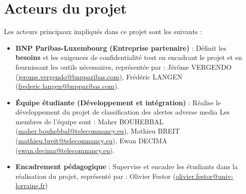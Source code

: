 \section{Acteurs du projet}

Les acteurs principaux impliqués dans ce projet sont les suivants :

\begin{itemize}
    \item \textbf{BNP Paribas-Luxembourg (Entreprise partenaire)} : Définit les \textbf{besoins} et les exigences de confidentialité tout en encadrant le projet et en fournissant les outils nécessaires, représentée par : Jérôme VERGENDO (\href{mailto:jerome.vergendo@bnpparibas.com}{jerome.vergendo@bnpparibas.com}), Frédéric LANGEN (\href{mailto:frederic.langen@bnpparibas.com}{frederic.langen@bnpparibas.com}).
    \item \textbf{Équipe étudiante (Développement et intégration)} : Réalise le développement du projet de classification des alertes adverse media
    Les membres de l'équipe sont : Maher BOUHEBBAL (\href{mailto:maher.bouhebbal@telecomnancy.eu}{maher.bouhebbal@telecomnancy.eu}), Mathieu BREIT (\href{mailto:mathieu.breit@telecomnancy.eu}{mathieu.breit@telecomnancy.eu}), Ewan DECIMA (\href{mailto:ewan.decima@telecomnancy.eu}{ewan.decima@telecomnancy.eu}).
    \item \textbf{Encadrement pédagogique} : Supervise et encadre les étudiants dans la réalisation du projet, représenté par : Olivier Festor (\href{mailto:olivier.festor@univ-lorraine.fr}{olivier.festor@univ-lorraine.fr})
\end{itemize}






